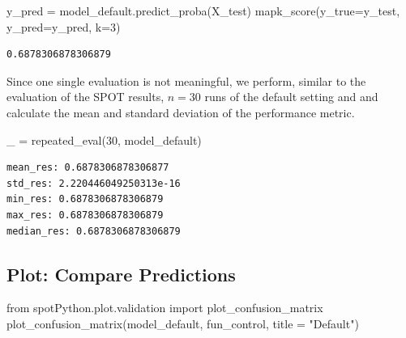 \documentclass[
  letterpaper,
  DIV=11,
  numbers=noendperiod]{scrreprt}
\newenvironment{Shaded}{\begin{snugshade}}{\end{snugshade}}
\newcommand{\DecValTok}[1]{\textcolor[rgb]{0.68,0.00,0.00}{#1}}
\newcommand{\ImportTok}[1]{\textcolor[rgb]{0.00,0.46,0.62}{#1}}
\newcommand{\NormalTok}[1]{\textcolor[rgb]{0.00,0.23,0.31}{#1}}
\newcommand{\OperatorTok}[1]{\textcolor[rgb]{0.37,0.37,0.37}{#1}}
\newcommand{\StringTok}[1]{\textcolor[rgb]{0.13,0.47,0.30}{#1}}
\begin{document}
\begin{Shaded}
\begin{Highlighting}[]
\NormalTok{y\_pred }\OperatorTok{=}\NormalTok{ model\_default.predict\_proba(X\_test)}
\NormalTok{mapk\_score(y\_true}\OperatorTok{=}\NormalTok{y\_test, y\_pred}\OperatorTok{=}\NormalTok{y\_pred, k}\OperatorTok{=}\DecValTok{3}\NormalTok{)}
\end{Highlighting}
\end{Shaded}

\begin{verbatim}
0.6878306878306879
\end{verbatim}

Since one single evaluation is not meaningful, we perform, similar to
the evaluation of the SPOT results, \(n=30\) runs of the default setting
and and calculate the mean and standard deviation of the performance
metric.

\begin{Shaded}
\begin{Highlighting}[]
\NormalTok{\_ }\OperatorTok{=}\NormalTok{ repeated\_eval(}\DecValTok{30}\NormalTok{, model\_default)}
\end{Highlighting}
\end{Shaded}

\begin{verbatim}
mean_res: 0.6878306878306877
std_res: 2.220446049250313e-16
min_res: 0.6878306878306879
max_res: 0.6878306878306879
median_res: 0.6878306878306879
\end{verbatim}

\hypertarget{plot-compare-predictions-4}{%
\subsection{Plot: Compare
Predictions}\label{plot-compare-predictions-4}}

\begin{Shaded}
\begin{Highlighting}[]
\ImportTok{from}\NormalTok{ spotPython.plot.validation }\ImportTok{import}\NormalTok{ plot\_confusion\_matrix}
\NormalTok{plot\_confusion\_matrix(model\_default, fun\_control, title }\OperatorTok{=} \StringTok{"Default"}\NormalTok{)}
\end{Highlighting}
\end{Shaded}
\end{document}
